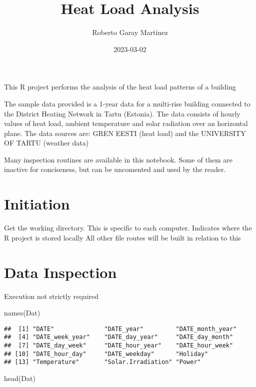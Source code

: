 \documentclass[
]{article}
\title{Heat Load Analysis}
\author{Roberto Garay Martinez}
\date{2023-03-02}
\newenvironment{Shaded}{\begin{snugshade}}{\end{snugshade}}
\newcommand{\FunctionTok}[1]{\textcolor[rgb]{0.00,0.00,0.00}{#1}}
\newcommand{\NormalTok}[1]{#1}
\begin{document}
\maketitle

This R project performs the analysis of the heat load patterns of a
building

The sample data provided is a 1-year data for a multi-rise building
connected to the District Heating Network in Tartu (Estonia). The data
consists of hourly values of heat load, ambient temperature and solar
radiation over an horizontal plane. The data sources are: GREN EESTI
(heat load) and the UNIVERSITY OF TARTU (weather data)

Many inspection routines are available in this notebook. Some of them
are inactive for conciseness, but can be uncomented and used by the
reader.

\hypertarget{initiation}{%
\section{Initiation}\label{initiation}}

Get the working directory. This is specific to each computer. Indicates
where the R project is stored locally All other file routes will be
built in relation to this

\hypertarget{data-inspection}{%
\section{Data Inspection}\label{data-inspection}}

Execution not strictly required

\begin{Shaded}
\begin{Highlighting}[]
  \FunctionTok{names}\NormalTok{(Dat)}
\end{Highlighting}
\end{Shaded}

\begin{verbatim}
##  [1] "DATE"              "DATE_year"         "DATE_month_year"  
##  [4] "DATE_week_year"    "DATE_day_year"     "DATE_day_month"   
##  [7] "DATE_day_week"     "DATE_hour_year"    "DATE_hour_week"   
## [10] "DATE_hour_day"     "DATE_weekday"      "Holiday"          
## [13] "Temperature"       "Solar.Irradiation" "Power"
\end{verbatim}

\begin{Shaded}
\begin{Highlighting}[]
  \FunctionTok{head}\NormalTok{(Dat)}
\end{Highlighting}
\end{Shaded}
\end{document}
